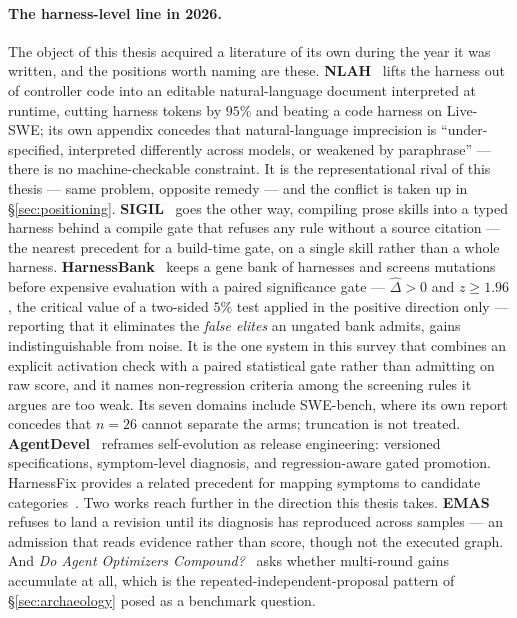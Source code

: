 \paragraph{The harness-level line in 2026.} The object of this thesis
acquired a literature of its own during the year it was written, and the
positions worth naming are these. \textbf{NLAH}~\cite{nlah} lifts the
harness out of controller code into an editable natural-language document
interpreted at runtime, cutting harness tokens by $95\%$ and beating a
code harness on Live-SWE; its own appendix concedes that natural-language
imprecision is ``under-specified, interpreted differently across models,
or weakened by paraphrase'' --- there is no machine-checkable constraint.
It is the representational rival of this thesis --- same problem, opposite
remedy --- and the conflict is taken up in \S\ref{sec:positioning}.
\textbf{SIGIL}~\cite{sigil} goes the other way, compiling prose skills
into a typed harness behind a compile gate that refuses any rule without
a source citation --- the nearest precedent for a build-time gate, on a
single skill rather than a whole harness. \textbf{HarnessBank}~\cite{harnessbank}
keeps a gene bank of harnesses and screens mutations before expensive
evaluation with a paired significance gate --- $\hat{\Delta} > 0$ and
$z \ge 1.96$, the critical value of a two-sided $5\%$ test applied in the
positive direction only --- reporting that it eliminates the \emph{false
elites} an ungated bank admits, gains indistinguishable from noise.
It is the one system in this survey that combines an explicit activation
check with a paired statistical gate rather than admitting on raw score, and it names non-regression criteria among the
screening rules it argues are too weak. Its seven domains include
SWE-bench, where its own report concedes that $n{=}26$ cannot separate the
arms; truncation is not treated.
\textbf{AgentDevel}~\cite{agentdevel} reframes self-evolution as release
engineering: versioned specifications, symptom-level diagnosis, and
regression-aware gated promotion. HarnessFix provides a related precedent
for mapping symptoms to candidate categories~\cite{harnessfix}. Two works reach further in the direction
this thesis takes. \textbf{EMAS}~\cite{emas} refuses to land a revision
until its diagnosis has reproduced across samples --- an admission that
reads evidence rather than score, though not the executed graph. And
\emph{Do Agent Optimizers Compound?}~\cite{compound} asks whether
multi-round gains accumulate at all, which is the repeated-independent-proposal
pattern of \S\ref{sec:archaeology} posed as a benchmark question.

